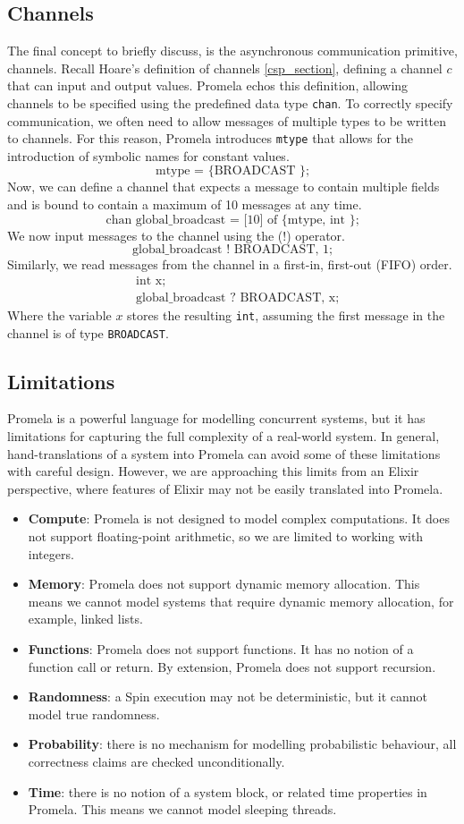 \subsection{Channels}
The final concept to briefly discuss, is the asynchronous communication primitive, channels. Recall Hoare's definition of channels \ref{csp_section}, defining a channel $c$ that can input and output values. Promela echos this definition, allowing channels to be specified using the predefined data type \texttt{chan}. To correctly specify communication, we often need to allow messages of multiple types to be written to channels. For this reason, Promela introduces \texttt{mtype} that allows for the introduction of symbolic names for constant values.
\[
\text{mtype = \{ BROADCAST \};}
\]
Now, we can define a channel that expects a message to contain multiple fields and is bound to contain a maximum of 10 messages at any time.
\[
\text{chan global\_broadcast = [10] of \{ mtype, int \};}
\]
We now input messages to the channel using the (!) operator.
\[
\text{global\_broadcast ! BROADCAST, 1;}
\]
Similarly, we read messages from the channel in a first-in, first-out (FIFO) order.
\[
\begin{aligned}
& \text{int x;} \\
& \text{global\_broadcast ? BROADCAST, x;}
\end{aligned}
\]
Where the variable $x$ stores the resulting \texttt{int}, assuming the first message in the channel is of type \texttt{BROADCAST}.
\subsection{Limitations}
Promela is a powerful language for modelling concurrent systems, but it has limitations for capturing the full complexity of a real-world system. In general, hand-translations of a system into Promela can avoid some of these limitations with careful design. However, we are approaching this limits from an Elixir perspective, where features of Elixir may not be easily translated into Promela.
\begin{itemize}
    \item \textbf{Compute}: Promela is not designed to model complex computations. It does not support floating-point arithmetic, so we are limited to working with integers.
    \item \textbf{Memory}: Promela does not support dynamic memory allocation. This means we cannot model systems that require dynamic memory allocation, for example, linked lists.
    \item \textbf{Functions}: Promela does not support functions. It has no notion of a function call or return. By extension, Promela does not support recursion.
    \item \textbf{Randomness}: a Spin execution may not be deterministic, but it cannot model true randomness.
    \item \textbf{Probability}: there is no mechanism for modelling probabilistic behaviour, all correctness claims are checked unconditionally.
    \item \textbf{Time}: there is no notion of a system block, or related time properties in Promela. This means we cannot model sleeping threads.
\end{itemize}
